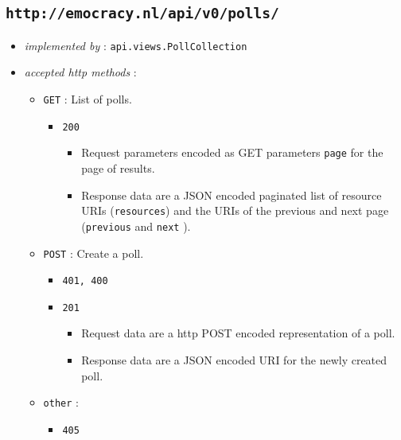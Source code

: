 \documentclass[a4paper]{report}
\begin{document}
\subsection{\texttt{http://emocracy.nl/api/v0/polls/}}
\begin{itemize}
    \item{\textsl{implemented by} : \texttt{api.views.PollCollection}}
    \item{\textsl{accepted http methods} :
        \begin{itemize}
            \item{\texttt{GET} : List of polls.
                \begin{itemize}
                    \item{\texttt{200}}
                    \begin{itemize}
                        \item{Request parameters encoded as GET parameters 
                        \texttt{page} for the page of results.}
                        \item{Response data are a JSON encoded paginated list of 
                        resource URIs (\texttt{resources}) and the URIs of the 
                        previous and next page (\texttt{previous} and \texttt{next}
                        ).}
                    \end{itemize}
                \end{itemize}
            }
            \item{\texttt{POST} : Create a poll.
                \begin{itemize}
                    \item{\texttt{401, 400}}
                    \item{\texttt{201}
                    \begin{itemize}
                        \item{Request data are a http POST encoded 
                        representation of a poll.}
                        \item{Response data are a JSON encoded URI for the newly
                        created poll.}
                    \end{itemize}
                    }
                \end{itemize}
            }
            
            \item{\texttt{other} :
                \begin{itemize}
                    \item{\texttt{405}}
                \end{itemize}
            }
        \end{itemize}
    }
\end{itemize}
\end{document}
